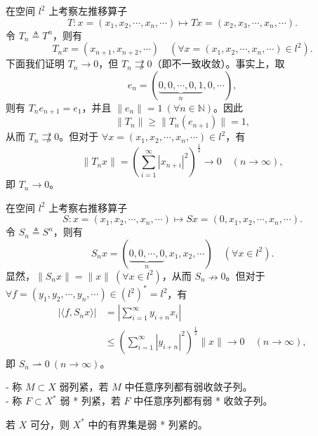 \documentclass[lang=cn,newtx,10pt,scheme=chinese,thmcnt=chapter]{elegantbook}
\begin{document}
\begin{example}[强收敛而不一致收敛]
在空间 $l^2$ 上考察左推移算子
\[
T: x = (x_1, x_2, \cdots, x_n, \cdots) \mapsto T x = (x_2, x_3, \cdots, x_n, \cdots).
\]
令 $T_n \triangleq T^n$，则有
\[
T_n x = (x_{n+1}, x_{n+2}, \cdots) \quad (\forall x = (x_1, x_2, \cdots, x_n, \cdots) \in l^2).
\]
下面我们证明 $T_n \to 0$，但 $T_n \not\rightrightarrows 0$（即不一致收敛）。事实上，取
\[
e_n = (\underbrace{0, 0, \cdots, 0, 1}_n, 0, \cdots),
\]
则有 $T_n e_{n+1} = e_1$，并且 $\|e_n\| = 1 \ (\forall n \in \mathbb{N})$。因此
\[
\|T_n\| \geqslant \|T_n(e_{n+1})\| = 1,
\]
从而 $T_n \not\rightrightarrows 0$。但对于 $\forall x = (x_1, x_2, \cdots, x_n, \cdots) \in l^2$，有
\[
\|T_n x\| = \left(\sum_{i=1}^\infty |x_{n+i}|^2\right)^{\frac{1}{2}} \to 0 \quad (n \to \infty),
\]
即 $T_n \to 0$。
\end{example}

\begin{example}[弱收敛而不强收敛]
在空间 $l^2$ 上考察右推移算子
\[
S: x = (x_1, x_2, \cdots, x_n, \cdots) \mapsto S x = (0, x_1, x_2, \cdots, x_n, \cdots).
\]
令 $S_n \triangleq S^n$，则有
\[
S_n x = (\underbrace{0, 0, \cdots, 0}_n, x_1, x_2, \cdots) \quad (\forall x \in l^2).
\]
显然，$\|S_n x\| = \|x\| \ (\forall x \in l^2)$，从而 $S_n \nrightarrow 0$。但对于 $\forall f = (y_1, y_2, \cdots, y_n, \cdots) \in (l^2)^* = l^2$，有
\[
\begin{aligned}
\left|\langle f, S_n x \rangle\right| &= \left|\sum_{i=1}^\infty y_{i+n} x_i\right| \\
&\leqslant \left(\sum_{i=1}^\infty |y_{i+n}|^2\right)^{\frac{1}{2}} \|x\| \to 0 \quad (n \to \infty),
\end{aligned}
\]
即 $S_n \rightharpoonup 0 \ (n \to \infty)$。
\end{example}
\begin{definition}[弱列紧 \& 弱 * 列紧]
- 称 $M \subset X$ 弱列紧，若 $M$ 中任意序列都有弱收敛子列。\\
- 称 $F \subset X^*$ 弱 * 列紧，若 $F$ 中任意序列都有弱 * 收敛子列。
\end{definition}

\begin{theorem}
若 $X$ 可分，则 $X^*$ 中的有界集是弱 * 列紧的。
\end{theorem}
\end{document}
